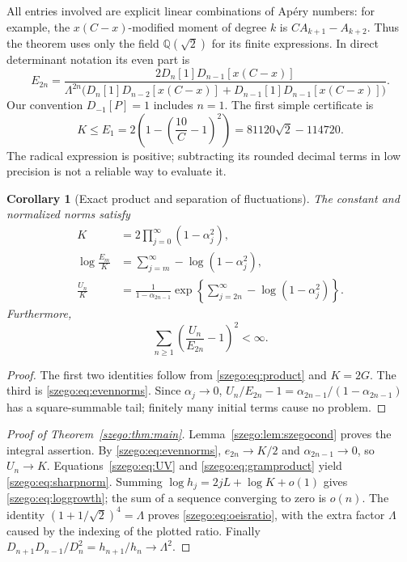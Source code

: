 \documentclass[11pt,a4paper]{article}
\numberwithin{equation}{section}
\newtheorem{corollary}[theorem]{Corollary}
\theoremstyle{remark}\newtheorem{remark}[theorem]{Remark}
\newcommand{\Lam}{\Lambda}
\begin{document}
All entries involved are explicit linear combinations of Ap\'ery numbers:
for example, the $x(C-x)$-modified moment of degree $k$ is
$CA_{k+1}-A_{k+2}$. Thus the theorem uses only the field $\mathbb Q(\sqrt2)$
for its finite expressions. In direct determinant notation its even part is
\begin{equation}\label{szego:eq:directenvelope}
 E_{2n}=\frac{2D_n[1]D_{n-1}[x(C-x)]}
 {\Lam^{2n}\bigl(D_n[1]D_{n-2}[x(C-x)]+D_{n-1}[1]D_{n-1}[x(C-x)]\bigr)}.
\end{equation}
Our convention $D_{-1}[P]=1$ includes $n=1$.
The first simple certificate is
\begin{equation}\label{szego:eq:E1}
 K\leq E_1=2\left(1-\left(\frac{10}{C}-1\right)^2\right)
 =81120\sqrt2-114720.
\end{equation}
The radical expression is positive; subtracting its rounded decimal terms
in low precision is not a reliable way to evaluate it.

\begin{corollary}[Exact product and separation of fluctuations]\label{szego:cor:separation}
The constant and normalized norms satisfy
\begin{align}
 K&=2\prod_{j=0}^{\infty}(1-\alpha_j^2),\label{szego:eq:Kproduct}\\
 \log\frac{E_m}{K}&=\sum_{j=m}^{\infty}-\log(1-\alpha_j^2),\label{szego:eq:tail}\\
 \frac{U_n}{K}&=\frac1{1-\alpha_{2n-1}}
  \exp\!\left\{\sum_{j=2n}^{\infty}-\log(1-\alpha_j^2)\right\}.\label{szego:eq:exacttransfer}
\end{align}
Furthermore,
\begin{equation}\label{szego:eq:squares}
 \sum_{n\geq1}\left(\frac{U_n}{E_{2n}}-1\right)^2<\infty.
\end{equation}
\end{corollary}
\begin{proof}
The first two identities follow from \eqref{szego:eq:product} and $K=2G$.
The third is \eqref{szego:eq:evennorms}. Since $\alpha_j\to0$,
$U_n/E_{2n}-1=\alpha_{2n-1}/(1-\alpha_{2n-1})$ has a square-summable tail;
finitely many initial terms cause no problem.
\end{proof}

\begin{proof}[Proof of Theorem~\ref{szego:thm:main}]
Lemma~\ref{szego:lem:szegocond} proves the integral assertion.
By \eqref{szego:eq:evennorms}, $e_{2n}\to K/2$ and $\alpha_{2n-1}\to0$, so
$U_n\to K$. Equations~\eqref{szego:eq:UV} and \eqref{szego:eq:gramproduct} yield
\eqref{szego:eq:sharpnorm}.
Summing
$\log h_j=2jL+\log K+o(1)$ gives \eqref{szego:eq:loggrowth}; the sum of a sequence
converging to zero is $o(n)$.
The identity $(1+1/\sqrt2)^4=\Lam$ proves \eqref{szego:eq:oeisratio}, with the
extra factor $\Lam$ caused by the indexing of the plotted ratio.
Finally $D_{n+1}D_{n-1}/D_n^2=h_{n+1}/h_n\to\Lam^2$.
\end{proof}
\end{document}
